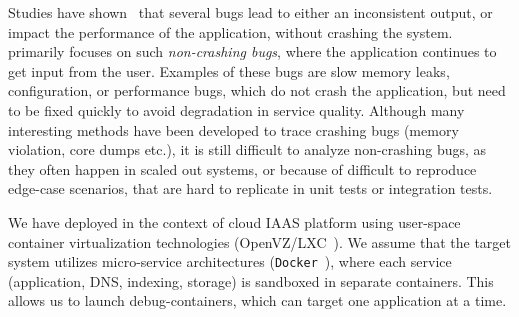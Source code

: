 \iffalse
This is done by cloning an application container, and creating two containers: a production container, and a debug container. 
We duplicate incoming traffic from downstream servers to both production and debug containers.
Similarly, we have another module, which replays responses sent from the production container, to the debug container so that it is completely isolated from the network. 
The debugging on the debug-container is done on-the-fly using dynamic instrumentation tools like DTrace~\cite{dtrace}, or iProbe~\cite{iProbe}. 
The cloned debug container acts like a sandbox which restricts it from causing any perturbation to the state of the parent process, or impacting the sanity of the responses to the production client. 
The cloning operation is ``live'', hence there is no suspension of the services of the production server.
\fi

Studies have shown~\cite{Zhang:2013:ADS:2486788.2486830, liu2005mining, kremenek2007factor} that several bugs lead to either an inconsistent output, or impact the performance of the application, without crashing the system.
\parikshan primarily focuses on such \emph{non-crashing bugs}, where the application continues to get input from the user.
Examples of these bugs are slow memory leaks, configuration, or performance bugs, which do not crash the application, but need to be fixed quickly to avoid degradation in service quality. 
Although many interesting methods have been developed to trace crashing bugs (memory violation, core dumps etc.), it is still difficult to analyze non-crashing bugs, as they often happen in scaled out systems, or because of difficult to reproduce edge-case scenarios, that are hard to replicate in unit tests or integration tests. 

We have deployed \parikshan in the context of cloud IAAS platform using user-space container virtualization technologies (OpenVZ/LXC~\cite{openvz,lxc}).
We assume that the target system utilizes micro-service architectures (\texttt{Docker}~\cite{docker}), where each service (application, DNS, indexing, storage) is sandboxed in separate containers.
This allows us to launch debug-containers, which can target one application at a time.


